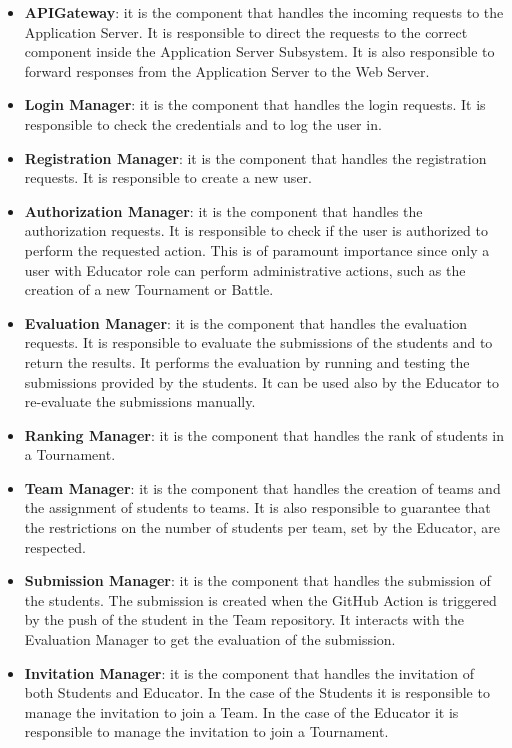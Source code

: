 \begin{itemize}
    \item \textbf{APIGateway}: it is the component that handles the incoming requests to the Application Server. It is responsible to direct the requests to the correct component inside the Application Server Subsystem. It is also responsible to forward responses from the Application Server to the Web Server.
    \item \textbf{Login Manager}: it is the component that handles the login requests. It is responsible to check the credentials and to log the user in.
    \item \textbf{Registration Manager}: it is the component that handles the registration requests. It is responsible to create a new user.
    \item \textbf{Authorization Manager}: it is the component that handles the authorization requests. It is responsible to check if the user is authorized to perform the requested action. This is of paramount importance since only a user with Educator role can perform administrative actions, such as the creation of a new Tournament or Battle.
    \item \textbf{Evaluation Manager}: it is the component that handles the evaluation requests. It is responsible to evaluate the submissions of the students and to return the results. It performs the evaluation by running and testing the submissions provided by the students. It can be used also by the Educator to re-evaluate the submissions manually.
    \item \textbf{Ranking Manager}: it is the component that handles the rank of students in a Tournament.
    \item \textbf{Team Manager}: it is the component that handles the creation of teams and the assignment of students to teams. It is also responsible to guarantee that the restrictions on the number of students per team, set by the Educator, are respected.
    \item \textbf{Submission Manager}: it is the component that handles the submission of the students. The submission is created when the GitHub Action is triggered by the push of the student in the Team repository. It interacts with the Evaluation Manager to get the evaluation of the submission.
    \item \textbf{Invitation Manager}: it is the component that handles the invitation of both Students and Educator. In the case of the Students it is responsible to manage the invitation to join a Team. In the case of the Educator it is responsible to manage the invitation to join a Tournament.

\end{itemize}
